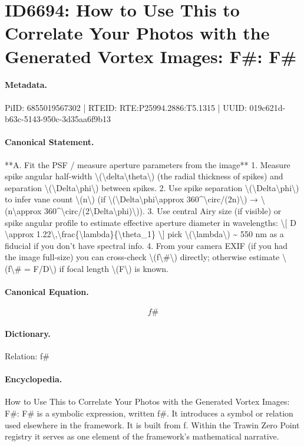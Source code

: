 \section*{ID6694: How to Use This to Correlate Your Photos with the Generated Vortex Images: F\#: F\#}
\paragraph{Metadata.}
PiID: 6855019567302 | RTEID: RTE:P25994.2886:T5.1315 | UUID: 019c621d-b63c-5143-950c-3d35aa6f9b13

\paragraph{Canonical Statement.}
**A. Fit the PSF / measure aperture parameters from the image** 1. Measure spike angular half-width \textbackslash{}(\textbackslash{}delta\textbackslash{}theta\textbackslash{}) (the radial thickness of spikes) and separation \textbackslash{}(\textbackslash{}Delta\textbackslash{}phi\textbackslash{}) between spikes. 2. Use spike separation \textbackslash{}(\textbackslash{}Delta\textbackslash{}phi\textbackslash{}) to infer vane count \textbackslash{}(n\textbackslash{}) (if \textbackslash{}(\textbackslash{}Delta\textbackslash{}phi\textbackslash{}approx 360\textasciicircum{}\textbackslash{}circ/(2n)\textbackslash{}) → \textbackslash{}(n\textbackslash{}approx 360\textasciicircum{}\textbackslash{}circ/(2\textbackslash{}Delta\textbackslash{}phi)\textbackslash{})). 3. Use central Airy size (if visible) or spike angular profile to estimate effective aperture diameter in wavelengths: \textbackslash{}[ D \textbackslash{}approx 1.22\textbackslash{},\textbackslash{}frac\{\textbackslash{}lambda\}\{\textbackslash{}theta\_1\} \textbackslash{}] pick \textbackslash{}(\textbackslash{}lambda\textbackslash{}) \textasciitilde{} 550 nm as a fiducial if you don’t have spectral info. 4. From your camera EXIF (if you had the image full-size) you can cross-check \textbackslash{}(f\textbackslash{}\#\textbackslash{}) directly; otherwise estimate \textbackslash{}(f\textbackslash{}\# = F/D\textbackslash{}) if focal length \textbackslash{}(F\textbackslash{}) is known.

\paragraph{Canonical Equation.}
\[
f\#
\]

\paragraph{Dictionary.}
Relation: f\#

\paragraph{Encyclopedia.}
How to Use This to Correlate Your Photos with the Generated Vortex Images: F\#: F\# is a symbolic expression, written f\#. It introduces a symbol or relation used elsewhere in the framework. It is built from f. Within the Trawin Zero Point registry it serves as one element of the framework's mathematical narrative.
